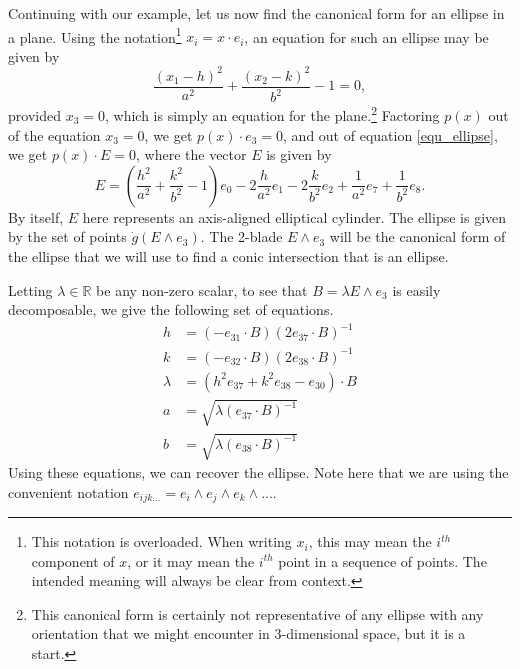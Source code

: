 \documentclass{birkjour}
\theoremstyle{definition}
\theoremstyle{remark}
\numberwithin{equation}{section}
\newcommand{\R}{\mathbb{R}}
\newcommand{\gd}{\dot{g}}
\begin{document}
Continuing with our example, let us now find the canonical form for an ellipse
in a plane.  Using the notation\footnote{This notation is overloaded.  When writing $x_i$, this may mean
the $i^{th}$ component of $x$, or it may mean the $i^{th}$ point in a sequence of points.  The intended
meaning will always be clear from context.} $x_i = x\cdot e_i$, an equation for such an ellipse
may be given by
\begin{equation}\label{equ_ellipse}
\frac{(x_1-h)^2}{a^2} + \frac{(x_2-k)^2}{b^2} - 1 = 0,
\end{equation}
provided $x_3=0$, which is simply an equation for the plane.\footnote{This canonical form is
certainly not representative of any ellipse with any orientation that we might encounter
in 3-dimensional space, but it is a start.}
Factoring $p(x)$ out of the equation $x_3=0$, we get $p(x)\cdot e_3=0$,
and out of equation \eqref{equ_ellipse}, we get $p(x)\cdot E=0$, where the
vector $E$ is given by
\begin{equation*}
E = \left(\frac{h^2}{a^2}+\frac{k^2}{b^2} - 1\right)e_0 -
  2\frac{h}{a^2}e_1 - 2\frac{k}{b^2}e_2 + \frac{1}{a^2}e_7 + \frac{1}{b^2}e_8.
\end{equation*}
By itself, $E$ here represents an axis-aligned elliptical cylinder.  The ellipse is given by
the set of points $\gd(E\wedge e_3)$.  The 2-blade $E\wedge e_3$ will be the
canonical form of the ellipse that we will use to find a conic intersection that
is an ellipse.

Letting $\lambda\in\R$ be any non-zero scalar, to see that
$B=\lambda E\wedge e_3$ is easily decomposable, we give the following set of
equations.
\begin{align}
h &= (-e_{31}\cdot B)(2e_{37}\cdot B)^{-1}\label{equ_decompose_first} \\
k &= (-e_{32}\cdot B)(2e_{38}\cdot B)^{-1} \\
\lambda &= (h^2e_{37}+k^2e_{38}-e_{30})\cdot B \\
a &= \sqrt{\lambda(e_{37}\cdot B)^{-1}} \\
b &= \sqrt{\lambda(e_{38}\cdot B)^{-1}}\label{equ_decompose_last}
\end{align}
Using these equations, we can recover the ellipse.  Note here that we
are using the convenient notation $e_{ijk\dots} = e_i\wedge e_j\wedge e_k\wedge\dots$.
\end{document}
